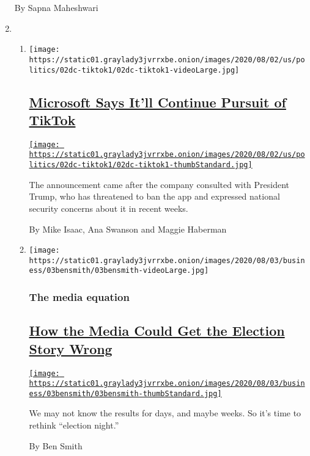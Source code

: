 \begin{enumerate}
  By Sapna Maheshwari
\item
  \begin{enumerate}
  \def\labelenumii{\arabic{enumii}.}
  \item
    \texttt{[image: https://static01.graylady3jvrrxbe.onion/images/2020/08/02/us/politics/02dc-tiktok1/02dc-tiktok1-videoLarge.jpg]}

    \hypertarget{microsoft-says-itll-continue-pursuit-of-tiktok}{%
    \subsection{\texorpdfstring{\href{/2020/08/02/business/economy/trump-tiktok-china-national-security.html}{Microsoft
    Says It'll Continue Pursuit of
    TikTok}}{Microsoft Says It'll Continue Pursuit of TikTok}}\label{microsoft-says-itll-continue-pursuit-of-tiktok}}

    \href{/2020/08/02/business/economy/trump-tiktok-china-national-security.html}{\texttt{[image: https://static01.graylady3jvrrxbe.onion/images/2020/08/02/us/politics/02dc-tiktok1/02dc-tiktok1-thumbStandard.jpg]}}

    The announcement came after the company consulted with President
    Trump, who has threatened to ban the app and expressed national
    security concerns about it in recent weeks.

    By Mike Isaac, Ana Swanson and Maggie Haberman
  \item
    \texttt{[image: https://static01.graylady3jvrrxbe.onion/images/2020/08/03/business/03bensmith/03bensmith-videoLarge.jpg]}

    \hypertarget{the-media-equation}{%
    \subsubsection{The media equation}\label{the-media-equation}}

    \hypertarget{how-the-media-could-get-the-election-story-wrong}{%
    \subsection{\texorpdfstring{\href{/2020/08/02/business/media/election-coverage.html}{How
    the Media Could Get the Election Story
    Wrong}}{How the Media Could Get the Election Story Wrong}}\label{how-the-media-could-get-the-election-story-wrong}}

    \href{/2020/08/02/business/media/election-coverage.html}{\texttt{[image: https://static01.graylady3jvrrxbe.onion/images/2020/08/03/business/03bensmith/03bensmith-thumbStandard.jpg]}}

    We may not know the results for days, and maybe weeks. So it's time
    to rethink ``election night.''

    By Ben Smith
  \end{enumerate}
\end{enumerate}

